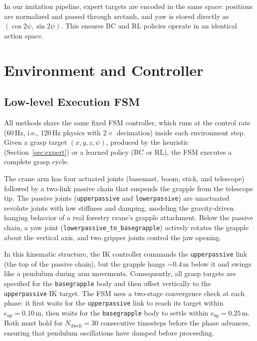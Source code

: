 \documentclass[conference]{IEEEtran}
\begin{document}
In our imitation pipeline, expert targets are encoded in the same space: positions are normalized and passed through $\mathrm{arctanh}$, and yaw is stored directly as $(\cos 2\psi, \sin 2\psi)$.
This ensures BC and RL policies operate in an identical action space.

\section{Environment and Controller}
\subsection{Low-level Execution FSM}
All methods share the same fixed FSM controller, which runs at the control rate (60\,Hz, i.e., 120\,Hz physics with $2\times$ decimation) inside each environment step.
Given a grasp target $(x,y,z,\psi)$, produced by the heuristic (Section~\ref{sec:expert}) or a learned policy (BC or RL), the FSM executes a complete grasp cycle.

The crane arm has four actuated joints (basemast, boom, stick, and telescope) followed by a two-link passive chain that suspends the grapple from the telescope tip.
The passive joints (\texttt{upperpassive} and \texttt{lowerpassive}) are unactuated revolute joints with low stiffness and damping, modeling the gravity-driven hanging behavior of a real forestry crane's grapple attachment.
Below the passive chain, a yaw joint (\texttt{lowerpassive\_to\_basegrapple}) actively rotates the grapple about the vertical axis, and two gripper joints control the jaw opening.

In this kinematic structure, the IK controller commands the \texttt{upperpassive} link (the top of the passive chain), but the grapple hangs $\sim$0.4\,m below it and swings like a pendulum during arm movements.
Consequently, all grasp targets are specified for the \texttt{basegrapple} body and then offset vertically to the \texttt{upperpassive} IK target.
The FSM uses a two-stage convergence check at each phase: it first waits for the \texttt{upperpassive} link to reach its target within $\epsilon_{\text{up}} = 0.10$\,m, then waits for the \texttt{basegrapple} body to settle within $\epsilon_{\text{bg}} = 0.25$\,m.
Both must hold for $N_{\text{dwell}} = 30$ consecutive timesteps before the phase advances, ensuring that pendulum oscillations have damped before proceeding.
\end{document}
